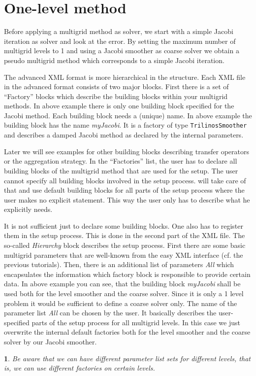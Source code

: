 \documentclass[10pt,fleqn]{book}
\newtheorem*{mycomment}{\ding{42}}
\begin{document}
\section{One-level method}
Before applying a multigrid method as solver, we start with a simple Jacobi iteration as solver and look at the error. By setting the maximum number of multigrid levels to 1 and using a Jacobi smoother as coarse solver we obtain a pseudo multigrid method which corresponds to a simple Jacobi iteration.



The advanced XML format is more hierarchical in the structure. Each XML file in the advanced format consists of two major blocks. First there is a set of ``Factory'' blocks which describe the building blocks within your multigrid methods. In above example there is only one building block specified for the Jacobi method. Each building block needs a (unique) name. In above example the building block has the name \textit{myJacobi}. It is a factory of type \verb|TrilinosSmoother| and describes a damped Jacobi method as declared by the internal parameters.

Later we will see examples for other building blocks describing transfer operators or the aggregation strategy.
In the ``Factories'' list, the user has to declare all building blocks of the multigrid method that are used for the setup. The user cannot specify all building blocks involved in the setup process. \muelu will take care of that and use default building blocks for all parts of the setup process where the user makes no explicit statement. This way the user only has to describe what he explicitly needs.

It is not sufficient just to declare some building blocks. One also has to register them in the setup process. This is done in the second part of the XML file. The so-called \textit{Hierarchy} block describes the setup process. First there are some basic multigrid parameters that are well-known from the easy XML interface (cf. the previous tutorials). Then, there is an additional list of parameters \textit{All} which encapsulates the information which factory block is responsible to provide certain data. In above example you can see, that the building block \textit{myJacobi} shall be used both for the level smoother and the coarse solver. Since it is only a 1 level problem it would be sufficient to define a coarse solver only.
The name of the parameter list \textit{All} can be chosen by the user. It basically describes the user-specified parts of the setup process for all multigrid levels. In this case we just overwrite the internal default factories both for the level smoother and the coarse solver by our Jacobi smoother.
\begin{mycomment}
Be aware that we can have different parameter list sets for different levels, that is, we can use different factories on certain levels.
\end{mycomment}
\end{document}
